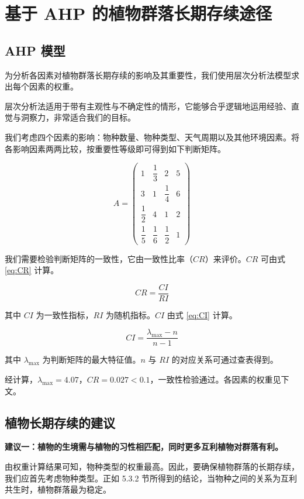 \documentclass[11pt,a4paper]{ctexart}
\begin{document}
\section{基于 AHP 的植物群落长期存续途径}

\subsection{AHP 模型}

为分析各因素对植物群落长期存续的影响及其重要性，我们使用层次分析法模型求出每个因素的权重。

层次分析法适用于带有主观性与不确定性的情形，它能够合乎逻辑地运用经验、直觉与洞察力，非常适合我们的目标。

我们考虑四个因素的影响：物种数量、物种类型、天气周期以及其他环境因素。将各影响因素两两比较，按重要性等级即可得到如下判断矩阵。

\[
A=\begin{pmatrix}
1 & \dfrac{1}{3} & 2 & 5\\[0.4em]
3 & 1 & \dfrac{1}{4} & 6\\[0.4em]
\dfrac{1}{2} & 4 & 1 & 2\\[0.4em]
\dfrac{1}{5} & \dfrac{1}{6} & \dfrac{1}{2} & 1
\end{pmatrix}
\]

我们需要检验判断矩阵的一致性，它由一致性比率（$CR$）来评价。$CR$ 可由式 \eqref{eq:CR} 计算。

\begin{equation}
CR=\frac{CI}{RI}
\label{eq:CR}
\end{equation}

其中 $CI$ 为一致性指标，$RI$ 为随机指标。$CI$ 由式 \eqref{eq:CI} 计算。

\begin{equation}
CI=\frac{\lambda_{\max}-n}{n-1}
\label{eq:CI}
\end{equation}

其中 $\lambda_{\max}$ 为判断矩阵的最大特征值。$n$ 与 $RI$ 的对应关系可通过查表得到。

经计算，$\lambda_{\max}=4.07$，$CR=0.027<0.1$，一致性检验通过。各因素的权重见下文。

\subsection{植物长期存续的建议}

\textbf{建议一：植物的生境需与植物的习性相匹配，同时更多互利植物对群落有利。}

由权重计算结果可知，物种类型的权重最高。因此，要确保植物群落的长期存续，我们应首先考虑物种类型。正如 5.3.2 节所得到的结论，当物种之间的关系为互利共生时，植物群落最为稳定。
\end{document}
